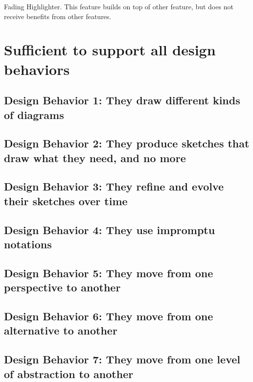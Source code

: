 Fading Highlighter. This feature builds on top of other feature, but does not receive benefits from other features.

%
%
%



\section{Sufficient to support all design behaviors}

\subsection{Design Behavior 1: They draw different kinds of diagrams}

\subsection{Design Behavior 2: They produce sketches that draw what they need, and no more}

\subsection{Design Behavior 3: They refine and evolve their sketches over time}

\subsection{Design Behavior 4: They use impromptu notations}

\subsection{Design Behavior 5: They move from one perspective to another}

\subsection{Design Behavior 6: They move from one alternative to another}

\subsection{Design Behavior 7: They move from one level of abstraction to another}

